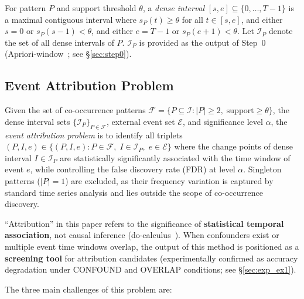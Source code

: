\begin{definition}\label{def:dense_interval}
For pattern $P$ and support threshold $\theta$,
a \emph{dense interval} $[s, e] \subseteq \{0, \ldots, T-1\}$ is a
maximal contiguous interval where $s_P(t) \geq \theta$ for all $t \in [s, e]$,
and either $s = 0$ or $s_P(s-1) < \theta$,
and either $e = T-1$ or $s_P(e+1) < \theta$.
Let $\mathcal{I}_P$ denote the set of all dense intervals of $P$.
$\mathcal{I}_P$ is provided as the output of Step~0
(Apriori-window~\cite{dsaa2025}; see \S\ref{sec:step0}).
\end{definition}

\subsection{Event Attribution Problem}

\begin{definition}\label{def:attribution}
Given the set of co-occurrence patterns
$\mathcal{F} = \{P \subseteq \mathcal{I} : |P| \geq 2,\; \text{support} \geq \theta\}$,
the dense interval sets $\{\mathcal{I}_P\}_{P \in \mathcal{F}}$,
external event set $\mathcal{E}$, and significance level $\alpha$,
the \emph{event attribution problem} is to identify all triplets
$(P, I, e) \in \{(P, I, e) : P \in \mathcal{F},\; I \in \mathcal{I}_P,\; e \in \mathcal{E}\}$
where the change points of dense interval $I \in \mathcal{I}_P$
are statistically significantly associated with the time window of event $e$,
while controlling the false discovery rate (FDR) at level $\alpha$.
Singleton patterns ($|P| = 1$) are excluded, as their frequency variation
is captured by standard time series analysis and lies outside the scope
of co-occurrence discovery.
\end{definition}

\begin{remark}\label{rem:attribution_scope}
``Attribution'' in this paper refers to the significance of
\textbf{statistical temporal association},
not causal inference (do-calculus~\cite{pearl2009causality}).
When confounders exist or multiple event time windows overlap,
the output of this method is positioned as a \textbf{screening tool}
for attribution candidates
(experimentally confirmed as accuracy degradation under CONFOUND and OVERLAP conditions;
see \S\ref{sec:exp_ex1}).
\end{remark}

The three main challenges of this problem are:

